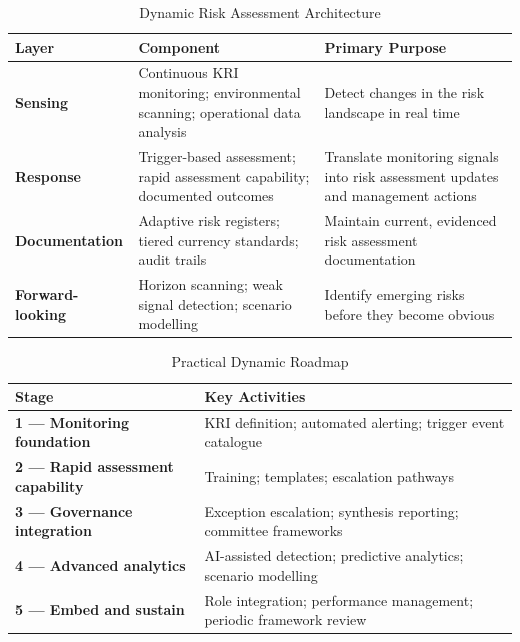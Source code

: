 \begin{table}[H]
  \centering
  \renewcommand{\arraystretch}{1.5}
  \begin{tabularx}{\textwidth}{ | >{\raggedright\arraybackslash}p{} 
								| >{\raggedright\arraybackslash}p{} 
                                | >{\raggedright\arraybackslash}X | }
    \hline
    \textbf{Layer} & \textbf{Component} & \textbf{Primary Purpose} \\
    \hline
    \textbf{Sensing} & Continuous KRI monitoring; environmental scanning; operational data analysis & Detect changes in the risk landscape in real time\\
    \hline
    \textbf{Response} & Trigger-based assessment; rapid assessment capability; documented outcomes & Translate monitoring signals into risk assessment updates and management actions\\
    \hline
    \textbf{Documentation} & Adaptive risk registers; tiered currency standards; audit trails & Maintain current, evidenced risk assessment documentation\\
    \hline
    \textbf{Forward-looking} & Horizon scanning; weak signal detection; scenario modelling & Identify emerging risks before they become obvious\\
    \hline
  \end{tabularx}
  \caption{Dynamic Risk Assessment Architecture}
\end{table}


\begin{table}[H]
  \centering
  \renewcommand{\arraystretch}{1.5}
  \begin{tabularx}{\textwidth}{ | >{\raggedright\arraybackslash}p{} 
                                | >{\raggedright\arraybackslash}X | }
    \hline
    \textbf{Stage} & \textbf{Key Activities} \\
    \hline
    \textbf{1 — Monitoring foundation} & KRI definition; automated alerting; trigger event catalogue\\
    \hline
    \textbf{2 — Rapid assessment capability} & Training; templates; escalation pathways\\
    \hline
    \textbf{3 — Governance integration} & Exception escalation; synthesis reporting; committee frameworks\\
    \hline
    \textbf{4 — Advanced analytics} & AI-assisted detection; predictive analytics; scenario modelling\\
    \hline
    \textbf{5 — Embed and sustain} & Role integration; performance management; periodic framework review\\
    \hline
  \end{tabularx}
  \caption{Practical Dynamic Roadmap}
\end{table}

